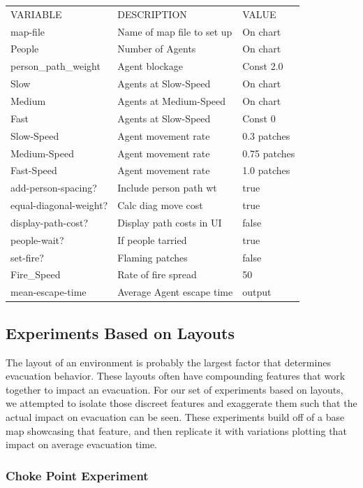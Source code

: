 \documentclass[12pt,letterpaper]{article}
\begin{document}
\begin{tabular}{ l | l | l }
VARIABLE & DESCRIPTION & VALUE \\
map-file & Name of map file to set up & On chart \\
People & Number of Agents & On chart \\
person\_path\_weight & Agent blockage & Const 2.0 \\
Slow & Agents at Slow-Speed & On chart \\
Medium & Agents at Medium-Speed & On chart \\
Fast & Agents at Slow-Speed & Const 0 \\
Slow-Speed & Agent movement rate & 0.3 patches \\
Medium-Speed & Agent movement rate  & 0.75 patches \\
Fast-Speed & Agent movement rate  & 1.0 patches \\
add-person-spacing? & Include person path wt & true \\
equal-diagonal-weight? & Calc diag move cost & true \\
display-path-cost? & Display path costs in UI & false \\
people-wait? & If people tarried & true \\
set-fire? & Flaming patches & false \\
Fire\_Speed & Rate of fire spread & 50 \\
mean-escape-time & Average Agent escape time & output \\
\end{tabular}

\subsection{Experiments Based on Layouts} \label{expLayout}

The layout of an environment is probably the largest factor that determines evacuation behavior.  These layouts often have compounding features that work together to impact an evacuation\cite{abmEvac}. For our set of experiments based on layouts, we attempted to isolate those discreet features and exaggerate them such that the actual impact on evacuation can be seen.  These experiments build off of a base map showcasing that feature, and then replicate it with variations plotting that impact on average evacuation time.


\subsubsection{Choke Point Experiment} \label{chokepoint}
\end{document}
